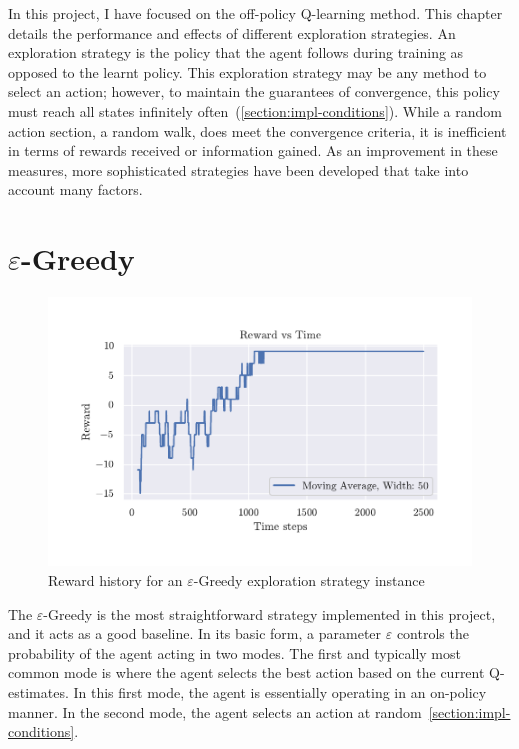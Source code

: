 \documentclass[]{final_report}
\begin{document}
In this project, I have focused on the off-policy Q-learning method. This chapter details the performance and effects of different exploration strategies. An exploration strategy is the policy that the agent follows during training as opposed to the learnt policy. This exploration strategy may be any method to select an action; however, to maintain the guarantees of convergence, this policy must reach all states infinitely often~(\ref{section:impl-conditions}). While a random action section, a random walk, does meet the convergence criteria, it is inefficient in terms of rewards received or information gained. As an improvement in these measures, more sophisticated strategies have been developed that take into account many factors.

\newpage
\section{\texorpdfstring{$\varepsilon$}{Lg}-Greedy}

\begin{figure}[H]
  \centering
  
  \includegraphics[trim={0 1cm 0 1cm},clip,width=\textwidth]{reward-history/EG.pdf}
  
  \caption{\label{fig:reward-history:eg} Reward history for an $\varepsilon$-Greedy exploration strategy instance}
\end{figure}


The $\varepsilon$-Greedy is the most straightforward strategy implemented in this project, and it acts as a good baseline. In its basic form, a parameter $\varepsilon$ controls the probability of the agent acting in two modes. The first and typically most common mode is where the agent selects the best action based on the current Q-estimates. In this first mode, the agent is essentially operating in an on-policy manner. In the second mode, the agent selects an action at random~\ref{section:impl-conditions}.
\end{document}
